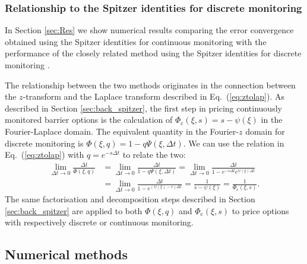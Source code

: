 \documentclass[11pt,a4paper]{article}
\begin{document}
\subsubsection{Relationship to the Spitzer identities for discrete monitoring}\label{sec:back_spitz_rel}

In Section \ref{sec:Res} we show numerical results comparing the error convergence obtained using the Spitzer identities for continuous monitoring with the performance of the closely related method using the Spitzer identities for discrete monitoring \citep{Green2010,Fusai2016,Phelan2017}.

The relationship between the two methods originates in the connection between the $z$-transform and the Laplace transform described in Eq.~(\ref{eq:ztolap}). As described in Section \ref{sec:back_spitzer}, the first step in pricing continuously monitored barrier options is the calculation of $\Phi_\mathrm{c}(\xi,s)=s-\psi(\xi)$ in the Fourier-Laplace domain. The equivalent quantity in the Fourier-$z$ domain for discrete monitoring is $\Phi(\xi,q)=1-q\Psi(\xi,\Delta t)$.
We can use the relation in Eq.~(\ref{eq:ztolap}) with $q=e^{-s\Delta t}$ to relate the two:
\begin{align}
\label{eq:LapPhi}
\lim_{\Delta t\rightarrow0}\frac{\Delta t}{\Phi(\xi,q)}& = \lim_{\Delta t\rightarrow0}\frac{\Delta t}{1-q\Psi(\xi,\Delta t)}
= \lim_{\Delta t\rightarrow0}\frac{\Delta t}{1-e^{-s\Delta t}e^{\psi(\xi)\Delta t}}\nonumber\\
& = \lim_{\Delta t\rightarrow0}\frac{\Delta t}{1-e^{(\psi(\xi)-s)\Delta t}}
= \frac{1}{s-\psi(\xi)}
= \frac{1}{\Phi_{\mathrm{c}}(\xi,s)}.
\end{align}
The same factorisation and decomposition steps described in Section \ref{sec:back_spitzer} \citep{Green2010,Fusai2016} are applied to both $\Phi(\xi,q)$ and $\Phi_{\mathrm{c}}(\xi,s)$ to price options with respectively discrete or continuous monitoring.

\subsection{Numerical methods}
\end{document}
